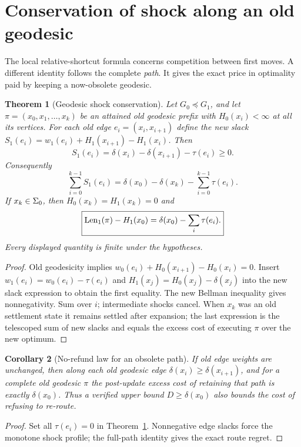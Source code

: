 \documentclass[11pt]{article}
\newtheorem{theorem}{Theorem}[section]
\newtheorem{corollary}[theorem]{Corollary}
\theoremstyle{definition}\newtheorem{definition}[theorem]{Definition}\newtheorem{assumption}[theorem]{Assumption}
\theoremstyle{remark}\newtheorem{remark}[theorem]{Remark}
\begin{document}
\section{Conservation of shock along an old geodesic}
\label{sec:conservation}
The local relative-shortcut formula concerns competition between first moves. A different identity follows the complete \emph{path}. It gives the exact price in optimality paid by keeping a now-obsolete geodesic.
\begin{theorem}[Geodesic shock conservation]\label{thm:conserve}
Let $G_0\preceq G_1$, and let $\pi=(x_0,x_1,\ldots,x_k)$ be an attained old geodesic prefix with $H_0(x_i)<\infty$ at all its vertices. For each old edge $e_i=(x_i,x_{i+1})$ define the new slack $S_1(e_i)=w_1(e_i)+H_1(x_{i+1})-H_1(x_i)$. Then
\[
\boxed{S_1(e_i)=\delta(x_i)-\delta(x_{i+1})-\tau(e_i)\geq0.}
\]
Consequently
\[
\boxed{\sum_{i=0}^{k-1}S_1(e_i)=\delta(x_0)-\delta(x_k)-\sum_{i=0}^{k-1}\tau(e_i).}
\]
If $x_k\in\Sigma_0$, then $H_0(x_k)=H_1(x_k)=0$ and
\[
\boxed{\operatorname{Len}_1(\pi)-H_1(x_0)=\delta(x_0)-\sum_i\tau(e_i).}
\]
Every displayed quantity is finite under the hypotheses.
\end{theorem}
\begin{proof}
Old geodesicity implies $w_0(e_i)+H_0(x_{i+1})-H_0(x_i)=0$. Insert $w_1(e_i)=w_0(e_i)-\tau(e_i)$ and $H_1(x_j)=H_0(x_j)-\delta(x_j)$ into the new slack expression to obtain the first equality. The new Bellman inequality gives nonnegativity. Sum over $i$; intermediate shocks cancel. When $x_k$ was an old settlement state it remains settled after expansion; the last expression is the telescoped sum of new slacks and equals the excess cost of executing $\pi$ over the new optimum.
\end{proof}
\par

\begin{corollary}[No-refund law for an obsolete path]\label{cor:refund}
If old edge weights are unchanged, then along each old geodesic edge $\delta(x_i)\geq\delta(x_{i+1})$, and for a complete old geodesic $\pi$ the post-update excess cost of retaining that path is exactly $\delta(x_0)$. Thus a verified upper bound $D\geq\delta(x_0)$ also bounds the cost of refusing to re-route.
\end{corollary}
\begin{proof}
Set all $\tau(e_i)=0$ in Theorem~\ref{thm:conserve}. Nonnegative edge slacks force the monotone shock profile; the full-path identity gives the exact route regret.
\end{proof}
\par
\end{document}
